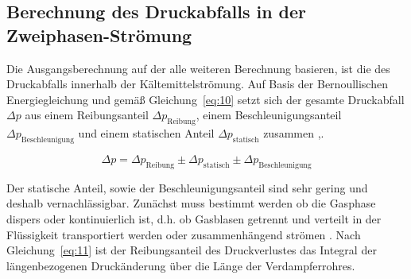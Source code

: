%



\subsection{Berechnung des Druckabfalls in der Zweiphasen-Strömung}
\label{subsec:Berechnung des Druckabfalls in der Zweiphasen-Strömung}

Die Ausgangsberechnung auf der alle weiteren Berechnung basieren, ist die des Druckabfalls innerhalb der Kältemittelströmung. Auf Basis der Bernoullischen Energiegleichung und gemäß Gleichung~\ref{eq:10} setzt sich der gesamte Druckabfall $\Delta p$ aus einem Reibungsanteil $\Delta p_{\mathrm{Reibung}}$, einem Beschleunigungsanteil $\Delta p_{\mathrm{Beschleunigung}}$ und einem statischen Anteil $\Delta p_{\mathrm{statisch}}$ zusammen \cite{SpringerVerlagGmbH.2013},\cite{J.MichaelDoster.}.

\begin{equation}
\label{eq:10}
\Delta p =  \Delta p_{\mathrm{Reibung}} \pm \Delta p_{\mathrm{statisch}} \pm \Delta p_{\mathrm{Beschleunigung}}
\end{equation}

Der statische Anteil, sowie der Beschleunigungsanteil sind sehr gering und deshalb vernachlässigbar. Zunächst muss bestimmt werden ob die Gasphase dispers oder kontinuierlich ist, d.h. ob Gasblasen getrennt und verteilt in der Flüssigkeit transportiert werden oder zusammenhängend strömen \cite{Kesper.1976}. Nach Gleichung~\ref{eq:11} ist der Reibungsanteil des Druckverlustes das Integral der längenbezogenen Druckänderung über die Länge der Verdampferrohres.

